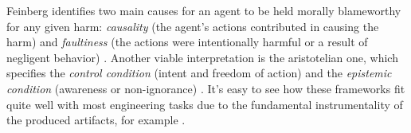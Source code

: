 Feinberg identifies two main causes for an agent to be held morally blameworthy for any given harm: \textit{causality} (the agent's actions contributed in causing the harm) and \textit{faultiness} (the actions were intentionally harmful or a result of negligent behavior) \parencite{FEISC}.
Another viable interpretation is the aristotelian one, which specifies the \textit{control condition} (intent and freedom of action) and the \textit{epistemic condition} (awareness or non-ignorance) \parencite{FISRAC}.
It's easy to see how these frameworks fit quite well with most engineering tasks due to the fundamental instrumentality of the produced artifacts, for example .
